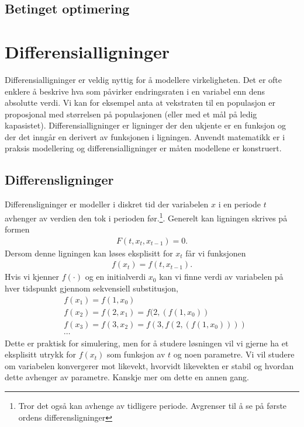 \section{Betinget optimering}
\chapter{Differensialligninger}
Differensialligninger er veldig nyttig for å modellere virkeligheten. Det er ofte enklere å beskrive hva som påvirker endringsraten i en variabel enn dens absolutte verdi. Vi kan for eksempel anta at vekstraten til en populasjon er proposjonal med størrelsen på populasjonen (eller med et mål på ledig kapasistet). Differensialligninger er ligninger der den ukjente er en funksjon og der det inngår en derivert av funksjonen i ligningen. Anvendt matematikk er i praksis modellering og differensialligninger er måten modellene er konstruert.
\section{Differensligninger}
Differensligninger er modeller i diskret tid der variabelen $x$ i en periode $t$ avhenger av verdien den tok i perioden før.\footnote{Tror det også kan avhenge av tidligere periode. Avgrenser til å se på første ordens differensligninger}. Generelt kan ligningen skrives på formen
\begin{align}
F(t,x_t, x_{t-1})=0.
\end{align}
Dersom denne ligningen kan løses eksplisitt for $x_t$ får vi funksjonen
\begin{align}
f(x_t)=f(t,x_{t-1}).
\end{align}
Hvis vi kjenner $f(\cdot)$ og en initialverdi $x_0$ kan vi finne verdi av variabelen på hver tidspunkt gjennom sekvensiell substitusjon,
\begin{align}
&f(x_1) = f(1,x_0) \\
&f(x_2) = f(2, x_1) = f(2,(f(1,x_0)) \\
&f(x_3) = f(3,x_2) = f(3,f(2,(f(1,x_0)))) \\
&\cdots
\end{align}
Dette er praktisk for simulering, men for å studere løsningen vil vi gjerne ha et eksplisitt utrykk for $f(x_t)$ som funksjon av $t$ og noen parametre. Vi vil studere om variabelen konvergerer mot likevekt, hvorvidt likevekten er stabil og hvordan dette avhenger av parametre. Kanskje mer om dette en annen gang.
